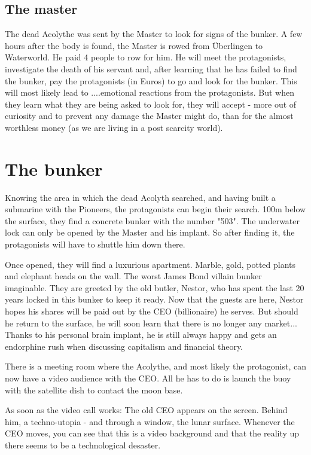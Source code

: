 \subsection{The master}

The dead Acolythe was sent by the Master to look for signs of the bunker. A few hours after the body is found, the Master is rowed from Überlingen to Waterworld. He paid 4 people to row for him. He will meet the protagonists, investigate the death of his servant and, after learning that he has failed to find the bunker, pay the protagonists (in Euros) to go and look for the bunker.
This will most likely lead to ....emotional reactions from the protagonists. But when they learn what they are being asked to look for, they will accept - more out of curiosity and to prevent any damage the Master might do, than for the almost worthless money (as we are living in a post scarcity world).

\section{The bunker}

Knowing the area in which the dead Acolyth searched, and having built a submarine with the Pioneers, the protagonists can begin their search. 100m below the surface, they find a concrete bunker with the number "503".
The underwater lock can only be opened by the Master and his implant. So after finding it, the protagonists will have to shuttle him down there.

Once opened, they will find a luxurious apartment. Marble, gold, potted plants and elephant heads on the wall. The worst James Bond villain bunker imaginable. They are greeted by the old butler, Nestor, who has spent the last 20 years locked in this bunker to keep it ready. Now that the guests are here, Nestor hopes his shares will be paid out by the CEO (billionaire) he serves. But should he return to the surface, he will soon learn that there is no longer any market...
Thanks to his personal brain implant, he is still always happy and gets an endorphine rush when discussing capitalism and financial theory.

There is a meeting room where the Acolythe, and most likely the protagonist, can now have a video audience with the CEO. All he has to do is launch the buoy with the satellite dish to contact the moon base.

As soon as the video call works: The old CEO appears on the screen. Behind him, a techno-utopia - and through a window, the lunar surface. Whenever the CEO moves, you can see that this is a video background and that the reality up there seems to be a technological desaster.

